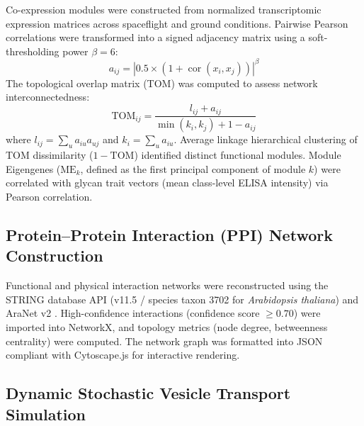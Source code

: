Co-expression modules were constructed from normalized transcriptomic expression matrices across spaceflight and ground conditions. Pairwise Pearson correlations were transformed into a signed adjacency matrix using a soft-thresholding power $\beta = 6$:
\begin{equation}
    a_{ij} = |0.5 \times (1 + \operatorname{cor}(x_i, x_j))|^\beta
\end{equation}
The topological overlap matrix (TOM) was computed to assess network interconnectedness:
\begin{equation}
    \text{TOM}_{ij} = \frac{l_{ij} + a_{ij}}{\min(k_i, k_j) + 1 - a_{ij}}
\end{equation}
where $l_{ij} = \sum_u a_{iu} a_{uj}$ and $k_i = \sum_u a_{iu}$. Average linkage hierarchical clustering of TOM dissimilarity ($1 - \text{TOM}$) identified distinct functional modules. Module Eigengenes ($\text{ME}_k$, defined as the first principal component of module $k$) were correlated with glycan trait vectors (mean class-level ELISA intensity) via Pearson correlation.

\subsection{Protein--Protein Interaction (PPI) Network Construction}

Functional and physical interaction networks were reconstructed using the STRING database API (v11.5 / species taxon 3702 for \textit{Arabidopsis thaliana}) and AraNet v2 \cite{Szklarczyk2019, Lee2015}. High-confidence interactions (confidence score $\ge 0.70$) were imported into NetworkX, and topology metrics (node degree, betweenness centrality) were computed. The network graph was formatted into JSON compliant with Cytoscape.js for interactive rendering.

\subsection{Dynamic Stochastic Vesicle Transport Simulation}

